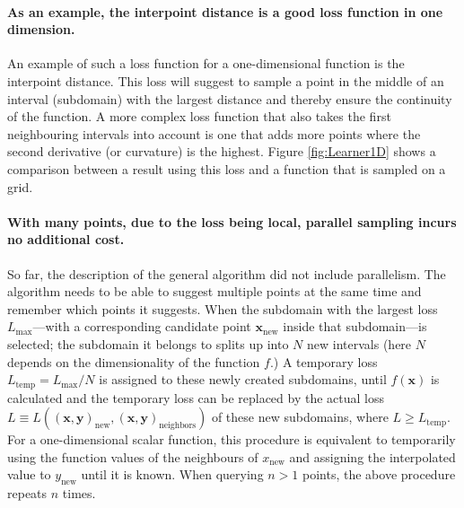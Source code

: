 \hypertarget{as-an-example-the-interpoint-distance-is-a-good-loss-function-in-one-dimension.}{%
\paragraph{As an example, the interpoint distance is a good loss function in one dimension.}\label{as-an-example-the-interpoint-distance-is-a-good-loss-function-in-one-dimension.}}

An example of such a loss function for a one-dimensional function is the interpoint distance.
This loss will suggest to sample a point in the middle of an interval (subdomain) with the largest distance and thereby ensure the continuity of the function.
A more complex loss function that also takes the first neighbouring intervals into account is one that adds more points where the second derivative (or curvature) is the highest.
Figure \ref{fig:Learner1D} shows a comparison between a result using this loss and a function that is sampled on a grid.

\hypertarget{with-many-points-due-to-the-loss-being-local-parallel-sampling-incurs-no-additional-cost.}{%
\paragraph{With many points, due to the loss being local, parallel sampling incurs no additional cost.}\label{with-many-points-due-to-the-loss-being-local-parallel-sampling-incurs-no-additional-cost.}}

So far, the description of the general algorithm did not include parallelism.
The algorithm needs to be able to suggest multiple points at the same time and remember which points it suggests.
When the subdomain with the largest loss $L_\textrm{max}$---with a corresponding candidate point $\bm{x}_\textrm{new}$ inside that subdomain---is selected; the subdomain it belongs to splits up into $N$ new intervals (here $N$ depends on the dimensionality of the function $f$.)
A temporary loss $L_\textrm{temp} = L_\textrm{max}/N$ is assigned to these newly created subdomains, until $f(\bm{x})$ is calculated and the temporary loss can be replaced by the actual loss $L \equiv L((\bm{x},\bm{y})_\textrm{new}, (\bm{x},\bm{y})_\textrm{neighbors})$ of these new subdomains, where $L \ge L_\textrm{temp}$.
For a one-dimensional scalar function, this procedure is equivalent to temporarily using the function values of the neighbours of $x_\textrm{new}$ and assigning the interpolated value to $y_\textrm{new}$ until it is known.
When querying $n>1$ points, the above procedure repeats $n$ times.

